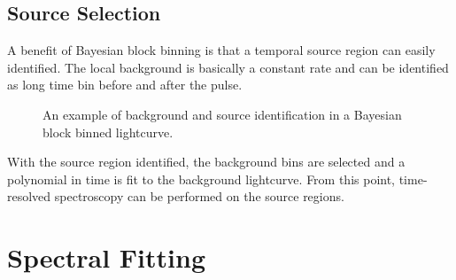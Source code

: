 \subsection{Source Selection}
A benefit of Bayesian block binning is that a temporal source region
can easily identified. The local background is basically a constant
rate and can be identified as long time bin before and after the
pulse.
\begin{figure}[h]
  \centering
  \caption{An example of background and source identification in a
    Bayesian block binned lightcurve.}
  \label{fig:bbselection}
\end{figure}
With the source region identified, the background bins are selected
and a polynomial in time is fit to the background lightcurve. From
this point, time-resolved spectroscopy can be performed on the source
regions.


\section{Spectral Fitting}
